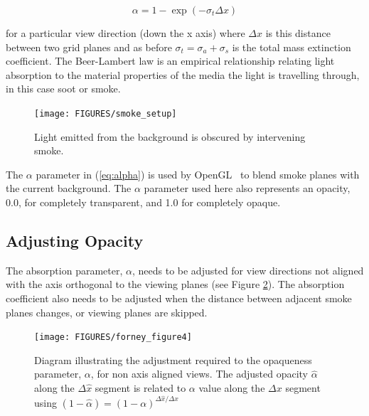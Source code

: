{\begin{equation}
\label{eq:alpha}
\alpha=1-\exp(-\sigma_t\Delta x)
\end{equation}

\noindent for a particular view direction (down the x axis) where $\Delta x$ is this distance between two grid planes and as before $\sigma_t=\sigma_a+\sigma_s$ is the total mass extinction coefficient.  The Beer-Lambert law is an empirical relationship relating light absorption to the material properties of the media the light is travelling through, in this case soot or smoke.

\begin{figure}[\figoptions]
\begin{center}
\texttt{[image: FIGURES/smoke\_setup]}
\end{center}
\caption[Light emitted from the background is obscured by intervening smoke.]
{Light emitted from the background is obscured by intervening smoke.
}
\label{figsmokesetup}
\end{figure}

The $\alpha$ parameter in (\ref{eq:alpha}) is used by OpenGL~\cite{OpenGLRed} to blend smoke planes with the current background.  The $\alpha$ parameter used here also represents an opacity, 0.0, for completely transparent, and 1.0 for completely opaque.


\subsection{Adjusting Opacity}

The absorption parameter, $\alpha$, needs to be adjusted for view directions not aligned with the axis orthogonal to the viewing planes (see Figure \ref{figray}).  The absorption coefficient also needs to be adjusted when the distance between adjacent smoke planes changes, or viewing planes are skipped.

\begin{figure}[\figoptions]
\centerline{\texttt{[image: FIGURES/forney\_figure4]}}
\caption [Diagram illustrating the adjustment required to the opaqueness parameter, $\alpha$,
for non-axis aligned views.] 
{ Diagram illustrating the adjustment required to the opaqueness parameter, $\alpha$,
for non axis aligned views. 
The adjusted opacity $\hat{\alpha}$ along the $\Delta\hat{x}$ segment is related to $\alpha$ value along the $\Delta x$ segment using $(1-\hat{\alpha})=(1-\alpha)^{\Delta \hat{x}/\Delta x}$}
\label{figray}
\end{figure}

}
